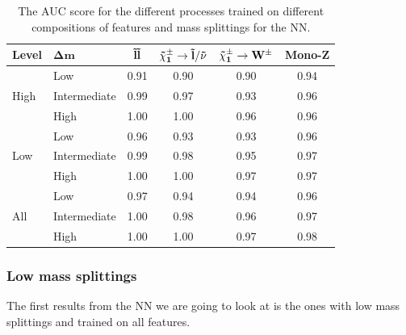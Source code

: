 \begin{table}[H]
    \centering
    \renewcommand{\arraystretch}{1.}
    \begin{tabular}{l l c c c c }
    \toprule
    \textbf{Level} & $\mathbf{\Delta m}$ & $\mathbf{\Tilde{l} \Tilde{l}}$ & $\mathbf{\Tilde{\chi}_1^\pm \rightarrow \Tilde{l}/\Tilde{\nu}}$ & $\mathbf{\Tilde{\chi}_1^\pm \rightarrow W^\pm}$ & \textbf{Mono-Z}  \\
    \midrule
    \midrule
    \multirow{3}{*}{High} &  Low   & 0.91 & 0.90 & 0.90 & 0.94 \\
     & Intermediate & 0.99 & 0.97 & 0.93 & 0.96 \\
     & High & 1.00 & 1.00 & 0.96 & 0.96 \\
     \midrule
    \multirow{3}{*}{Low} & Low & 0.96 & 0.93 & 0.93 & 0.96 \\
     & Intermediate & 0.99 & 0.98 & 0.95 & 0.97 \\
     & High & 1.00 & 1.00 & 0.97 & 0.97 \\
     \midrule
    \multirow{3}{*}{All} & Low & 0.97 & 0.94 & 0.94 & 0.96 \\
     & Intermediate & 1.00 & 0.98 & 0.96 & 0.97 \\
     & High & 1.00 & 1.00 & 0.97 & 0.98 \\
     \bottomrule
    \end{tabular}
    \caption{The AUC score for the different processes trained on different compositions of features and mass splittings for the NN.}
    \label{tab:AUCNN}
\end{table}






\subsubsection{Low mass splittings}
The first results from the NN we are going to look at is the ones with low mass splittings and trained on all features. 

